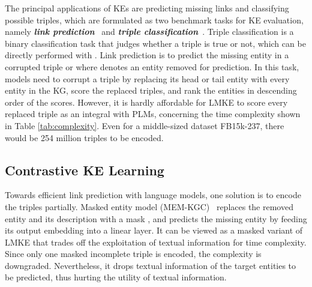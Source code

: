 \documentclass{article}
\begin{document}
The principal applications of KEs are predicting missing links and classifying possible triples, which are formulated as two benchmark tasks for KE evaluation, namely \textbf{\textit{link prediction}}~\cite{bordes2013transe} and \textbf{\textit{triple classification}}~\cite{socher2013ntn}.
Triple classification is a binary classification task that judges whether a triple  is true or not, which can be directly performed with  .
Link prediction is to predict the missing entity in a corrupted triple  or  where  denotes an entity removed for prediction. 
In this task, models need to corrupt a triple by replacing its head or tail entity with every entity in the KG, score the replaced triples, and rank the entities in descending order of the scores.
However, it is hardly affordable for LMKE to score every replaced triple as an integral with PLMs, concerning the time complexity shown in Table \ref{tab:complexity}. 
Even for a middle-sized dataset FB15k-237, there would be 254 million triples to be encoded. 




\begin{table}[htbp]
    \small
    \centering
{}
    \caption{The time complexity of training and link prediction evaluation. 
     or  denotes the number of entities or relations in the KG. 
     or  is the number of triples in the training or evaluation split.  is the negative sampling size. C-LMKE denotes contrastive LMKE, whose complexity is lower than prior approaches.}
    \label{tab:complexity}
\end{table}




\subsection{Contrastive KE Learning}

Towards efficient link prediction with language models, 
one solution is to encode the triples partially.
Masked entity model (MEM-KGC)~\cite{choi2021memkgc} replaces the removed entity and its description with a mask , and predicts the missing entity by feeding its output embedding  into a linear layer.
It can be viewed as a masked variant of LMKE that trades off the exploitation of textual information for time complexity.
Since only one masked incomplete triple is encoded, the complexity is downgraded.
Nevertheless, it drops textual information of the target entities to be predicted, thus hurting the utility of textual information. 
\end{document}
